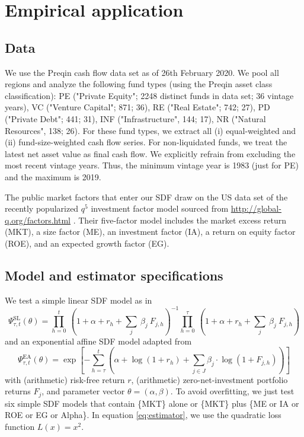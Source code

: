 \documentclass[12pt]{article}
\begin{document}
\section{Empirical application}
\label{sec:empirical_application}

\subsection{Data}

We use the Preqin cash flow data set as of 26th February 2020.
We pool all regions and analyze the following fund types (using the Preqin asset class classification):
PE ("Private Equity"; 2248 distinct funds in data set; 36 vintage years),
VC ("Venture Capital"; 871; 36),
RE ("Real Estate"; 742; 27),
PD ("Private Debt"; 441; 31),
INF ("Infrastructure", 144; 17), 
NR ("Natural Resources", 138; 26).
For these fund types, we extract all (i) equal-weighted and (ii) fund-size-weighted cash flow series.
For non-liquidated funds, we treat the latest net asset value as final cash flow.
We explicitly refrain from excluding the most recent vintage years.
Thus, the minimum vintage year is 1983 (just for PE) and the maximum is 2019.

The public market factors that enter our SDF draw on the US data set of the recently popularized $q^5$ investment factor model sourced from \url{http://global-q.org/factors.html} \citep{HXZ15,HXZ20}. 
Their five-factor model includes the market excess return (MKT), a size factor (ME), an investment factor (IA), a return on equity factor (ROE), and an expected growth factor (EG).


\subsection{Model and estimator specifications}
\label{sec:model_selection}
We test a simple linear SDF model as in \cite{DLP12}
\begin{equation}
\label{eq:linear_sdf}
\Psi_{\tau,t}^{\mathrm{SL}} (\theta) = 
\prod_{h=0}^{t}\ \left(1 + \alpha + r_{h} + \sum_j\ \beta_j\ F_{j,h} \right)^{-1}
\prod_{h=0}^{\tau}\ \left(1 + \alpha + r_{h} + \sum_j\ \beta_j \ F_{j,h} \right)
\end{equation}
and an exponential affine SDF model adapted from \cite{KN16}
\begin{equation}
\label{eq:expaff_SDF}
\Psi_{\tau,t}^{\mathrm{EA}} (\theta) = 
\exp
\left[
-
\sum_{h=\tau}^{t} \left( \alpha + \log (1 + r_h) + \sum_{j \in J} \beta_{j} \cdot \log (1 + F_{j,h}) \right)
\right]
\end{equation}
with (arithmetic) risk-free return $r$, (arithmetic) zero-net-investment portfolio returns $F_j$, and parameter vector $\theta=(\alpha,\beta)$.
To avoid overfitting, we just test six simple SDF models that contain \{MKT\} alone or \{MKT\} plus \{ME or IA or ROE or EG or Alpha\}.
In equation \ref{eq:estimator}, we use the quadratic loss function $L(x)=x^2$.
\end{document}
